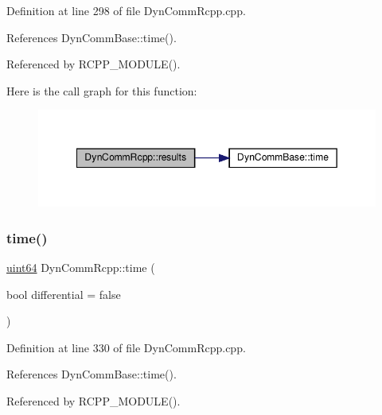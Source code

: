 Definition at line 298 of file Dyn\+Comm\+Rcpp.\+cpp.



References Dyn\+Comm\+Base\+::time().



Referenced by R\+C\+P\+P\+\_\+\+M\+O\+D\+U\+L\+E().

Here is the call graph for this function\+:
\nopagebreak
\begin{figure}[H]
\begin{center}
\leavevmode
\includegraphics[width=349pt]{classDynCommRcpp_a4120d9f0232611e4ecb497eaf6e4706a_cgraph}
\end{center}
\end{figure}
\mbox{\label{classDynCommRcpp_a89773080b66fd210a7e22234ba04a19f}} 
\subsubsection{\texorpdfstring{time()}{time()}}
{\footnotesize\ttfamily \hyperlink{systemDefines_8h_abc0f5bc07737e498f287334775dff2b6}{uint64} Dyn\+Comm\+Rcpp\+::time (\begin{DoxyParamCaption}\item[{bool}]{differential = {\ttfamily false} }\end{DoxyParamCaption})\hspace{0.3cm}{\ttfamily [inline]}}



Definition at line 330 of file Dyn\+Comm\+Rcpp.\+cpp.



References Dyn\+Comm\+Base\+::time().



Referenced by R\+C\+P\+P\+\_\+\+M\+O\+D\+U\+L\+E().

